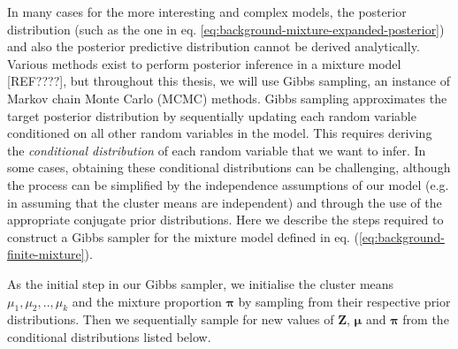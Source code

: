In many cases for the more interesting and complex models, the posterior distribution (such as the one in eq. \ref{eq:background-mixture-expanded-posterior}) and also the posterior predictive distribution cannot be derived analytically. Various methods exist to perform posterior inference in a mixture model [REF????], but throughout this thesis, we will use Gibbs sampling, an instance of Markov chain Monte Carlo (MCMC) methods. Gibbs sampling approximates the target posterior distribution by sequentially updating each random variable conditioned on all other random variables in the model. This requires deriving the \emph{conditional distribution} of each random variable that we want to infer. In some cases, obtaining these conditional distributions can be challenging, although the process can be simplified by the independence assumptions of our model (e.g. in assuming that the cluster means are independent) and through the use of the appropriate conjugate prior distributions.  Here we describe the steps required to construct a Gibbs sampler for the mixture model defined in eq. (\ref{eq:background-finite-mixture}).

As the initial step in our Gibbs sampler, we initialise the cluster means $\mu_1,\mu_2,..,\mu_k$ and the mixture proportion $\boldsymbol{\pi}$ by sampling from their respective prior distributions. Then we sequentially sample for new values of $\boldsymbol{Z}$, $\boldsymbol{\mu}$ and $\boldsymbol{\pi}$ from the conditional distributions listed below. 

